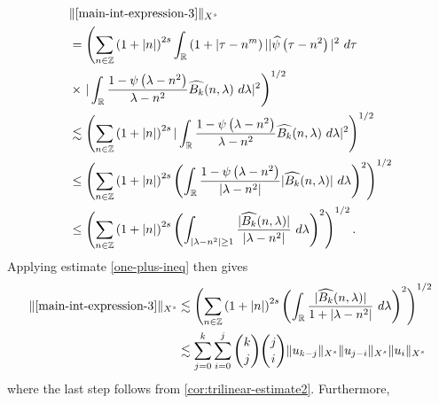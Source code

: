 \documentclass[12pt,reqno]{amsart}
\numberwithin{equation}{section}  %
\numberwithin{figure}{section}
\newcommand{\rr}{\mathbb{R}}
\newcommand{\zz}{\mathbb{Z}}
\newcommand{\wh}{\widehat}
\theoremstyle{plain}
\theoremstyle{definition}
\theoremstyle{remark}
\begin{document}
\begin{equation*}
  \begin{split}
    & \| \eqref{main-int-expression-3} \|_{X^s} 
    \\
    & = \left( \sum_{n \in \zz} \left (1 + |n| \right )^{2s} \int_\rr \left( 1 + | \tau - n^{m
    } \right ) | | \wh{\psi}\left( \tau - n^{2} \right) |^2 \ d \tau
    \right.
    \\
    & \times \left . |
    \int_\rr \frac{1 - \psi\left( \lambda - n^{2} \right)}{\lambda -
    n^{2}} \wh{{B_k}}(n, \lambda) \ d \lambda |^2  \right)^{1/2}
    \\
    & \lesssim \left( \sum_{n \in \zz} \left (1 + |n| \right )^{2s} | \int_\rr
    \frac{1 - \psi\left( \lambda - n^{2} \right)}{\lambda - n^{2}}
    \wh{{B_k}}(n, \lambda) \ d\lambda |^2 \right)^{1/2}
    \\
    & \le \left( \sum_{n \in \zz} \left (1 + |n| \right )^{2s}  \left ( \int_\rr
    \frac{1 - \psi\left( \lambda - n^{2} \right)}{|\lambda - n^{2}|}
    |\wh{{B_k}}(n, \lambda) | \ d\lambda \right )^2 \right)^{1/2}
    \\
    & \le \left( \sum_{n \in \zz} \left (1 + |n| \right )^{2s}  \left ( \int_{| \lambda - 
    n^{2} | \ge 1}
    \frac{|\wh{{B_k}}(n, \lambda) | }{|\lambda - n^{2}|}
    \ d\lambda \right )^2 \right)^{1/2}.
  \end{split}
\end{equation*}
%
%
Applying estimate \eqref{one-plus-ineq} then gives
%
\begin{equation}
  \label{main-int3-est-X-s-part}
  \begin{split}
    \| \eqref{main-int-expression-3} \|_{X^s}
    & \lesssim \left( \sum_{n \in \zz} \left (1 + |n| \right )^{2s}  \left ( \int_\rr
    \frac{|\wh{{B_k}}(n, \lambda)| }{1 + |\lambda - n^{2}|}
     \ d\lambda \right )^2 \right)^{1/2}
     \\
    & \lesssim \sum_{j=0}^{k} \sum_{i=0}^{j} {k \choose j}{j \choose i}
    \|u_{k-j}\|_{X^s} \| u_{j-i}\|_{X^s}
    \| u_i \|_{X^s}
  \end{split}
\end{equation}
%
where the last step follows from \autoref{cor:trilinear-estimate2}.
Furthermore, 
%
%
\end{document}
